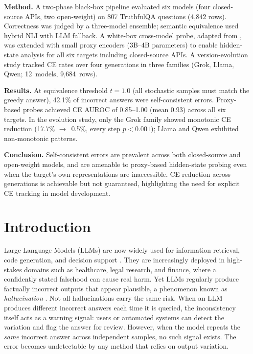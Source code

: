 \documentclass[12pt,twocolumn]{article}
\begin{document}
\textbf{Method.}
A two-phase black-box pipeline evaluated six models (four
closed-source APIs, two open-weight) on 807 TruthfulQA questions
(4,842 rows). Correctness was judged by a three-model ensemble;
semantic equivalence used hybrid NLI with LLM fallback. A white-box
cross-model probe, adapted from \citet{tan2025consistent}, was
extended with small proxy encoders (3B--4B parameters) to enable
hidden-state analysis for all six targets including closed-source
APIs. A version-evolution study tracked CE rates over four
generations in three families (Grok, Llama, Qwen; 12~models,
9,684~rows).

\textbf{Results.}
At equivalence threshold $t{=}1.0$ (all stochastic samples must
match the greedy answer), 42.1\% of incorrect answers were
self-consistent errors. Proxy-based probes achieved CE AUROC of
0.85--1.00 (mean 0.93) across all six targets. In the evolution
study, only the Grok family showed monotonic CE reduction (17.7\%
$\to$~0.5\%, every step $p < 0.001$); Llama and Qwen exhibited
non-monotonic patterns.

\textbf{Conclusion.}
Self-consistent errors are prevalent across both closed-source and
open-weight models, and are amenable to proxy-based hidden-state
probing even when the target's own representations are inaccessible.
CE reduction across generations is achievable but not guaranteed,
highlighting the need for explicit CE tracking in model development.

\tableofcontents
\clearpage

\section{Introduction}
\label{sec:intro}

Large Language Models (LLMs) are now widely used for information
retrieval, code generation, and decision support
\citep{huang2025survey}. They are increasingly deployed in
high-stakes domains such as healthcare, legal research, and finance,
where a confidently stated falsehood can cause real harm. Yet LLMs
regularly produce factually incorrect outputs that appear
plausible, a phenomenon known as \emph{hallucination}
\citep{ji2023hallucination}. Not all hallucinations carry the same
risk. When an LLM produces different incorrect answers each time it
is queried, the inconsistency itself acts as a warning signal:
users or automated systems can detect the variation and flag the
answer for review. However, when the model repeats the \emph{same}
incorrect answer across independent samples, no such signal exists.
The error becomes undetectable by any method that relies on output
variation.
\end{document}
